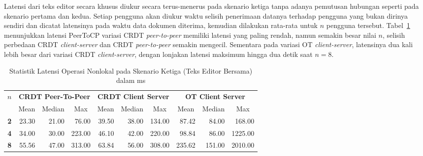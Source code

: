 Latensi dari teks editor secara khusus diukur secara terus-menerus pada skenario ketiga tanpa adanya pemutusan hubungan seperti pada skenario pertama dan kedua. Setiap pengguna akan diukur waktu selisih penerimaan datanya terhadap pengguna yang bukan dirinya sendiri dan dicatat latensinya pada waktu data dokumen diterima, kemudian dilakukan rata-rata untuk $n$ pengguna tersebut. Tabel~\ref{tab:latency-3} menunjukkan latensi PeerToCP variasi CRDT \textit{peer-to-peer} memiliki latensi yang paling rendah, namun semakin besar nilai $n$, selisih perbedaan CRDT \textit{client-server} dan CRDT \textit{peer-to-peer} semakin mengecil. Sementara pada variasi OT \textit{client-server}, latensinya dua kali lebih besar dari variasi CRDT \textit{client-server}, dengan lonjakan latensi maksimum hingga dua detik saat $n = 8$.

\begin{table}[H]
 \centering
\begin{tabular}{|c|rrr|rrr|rrr|}
\hline
\multirow{2}{*}{$n$} & \multicolumn{3}{c|}{\textbf{CRDT Peer-To-Peer}} & \multicolumn{3}{c|}{\textbf{CRDT Client Server}} & \multicolumn{3}{c|}{\textbf{OT Client Server}} \\ \cline{2-10}
 & \multicolumn{1}{c|}{Mean} & \multicolumn{1}{c|}{Median} & \multicolumn{1}{c|}{Max} & \multicolumn{1}{c|}{Mean} & \multicolumn{1}{c|}{Median} & \multicolumn{1}{c|}{Max} & \multicolumn{1}{c|}{Mean} & \multicolumn{1}{c|}{Median} & \multicolumn{1}{c|}{Max} \\ \hline
\textbf{2} & \multicolumn{1}{r|}{23.30} & \multicolumn{1}{r|}{21.00} & 76.00 & \multicolumn{1}{r|}{39.50} & \multicolumn{1}{r|}{38.00} & 134.00 & \multicolumn{1}{r|}{87.42} & \multicolumn{1}{r|}{84.00} & 168.00 \\ \hline
\textbf{4} & \multicolumn{1}{r|}{34.00} & \multicolumn{1}{r|}{30.00} & 223.00 & \multicolumn{1}{r|}{46.10} & \multicolumn{1}{r|}{42.00} & 220.00 & \multicolumn{1}{r|}{98.84} & \multicolumn{1}{r|}{86.00} & 1225.00 \\ \hline
\textbf{8} & \multicolumn{1}{r|}{55.56} & \multicolumn{1}{r|}{47.00} & 313.00 & \multicolumn{1}{r|}{63.84} & \multicolumn{1}{r|}{56.00} & 308.00 & \multicolumn{1}{r|}{235.62} & \multicolumn{1}{r|}{151.00} & 2010.00 \\ \hline
\end{tabular}
 \caption{Statistik Latensi Operasi Nonlokal pada Skenario Ketiga (Teks Editor Bersama) dalam ms}
 \label{tab:latency-3}
\end{table}

